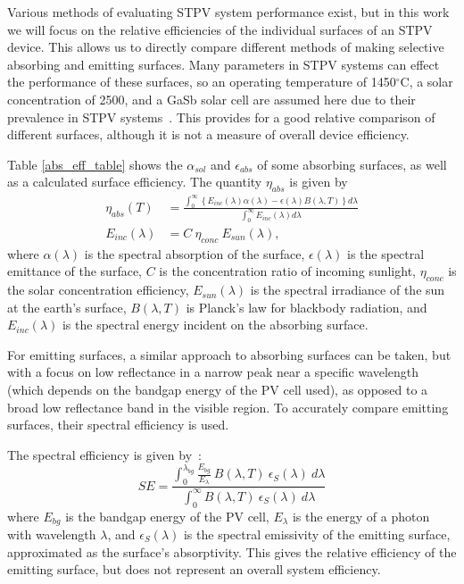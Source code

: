 \documentclass[10pt,letterpaper]{article}
\begin{document}
Various methods of evaluating STPV system performance exist, but in this work we will focus on the relative efficiencies of the individual surfaces of an STPV device.  This allows us to directly compare different methods of making selective absorbing and emitting surfaces.  Many parameters in STPV systems can effect the performance of these surfaces, so an operating temperature of 1450$^\circ$C, a solar concentration of 2500, and a GaSb solar cell are assumed here due to their prevalence in STPV systems~\cite{exp_tokyo,exp_madrid,exp_russia,me1,me2,RF_OptExp_2009}.  This provides for a good relative comparison of different surfaces, although it is not a measure of overall device efficiency.

Table \ref{abs_eff_table} shows the $\alpha_{sol}$ and $\epsilon_{abs}$ of some absorbing surfaces, as well as a calculated surface efficiency.  The quantity $\eta_{abs}$ is given by
\begin{align}
\label{overall_sss_eq}\eta_{abs}(T)& = \frac{\int_{0}^{\infty}\left\{E_{inc}(\lambda)\alpha(\lambda)-\epsilon(\lambda)B(\lambda,T)\right\}d\lambda}{\int_{0}^{\infty}E_{inc}(\lambda)d\lambda}\\
\label{e_incident}E_{inc}(\lambda) &= C \: \eta_{conc} \: E_{sun}(\lambda),
\end{align}
where $\alpha(\lambda)$ is the spectral absorption of the surface, $\epsilon(\lambda)$ is the spectral emittance of the surface, $C$ is the concentration ratio of incoming sunlight, 
$\eta_{conc}$ is the solar concentration efficiency, $E_{sun}(\lambda)$ is the 
spectral irradiance of the sun at the earth's surface, $B(\lambda, T)$ is 
Planck's law for blackbody radiation, and $E_{inc}(\lambda)$ is the spectral 
energy incident on the absorbing surface.

For emitting surfaces, a similar approach to absorbing surfaces can be taken, but with a focus on low reflectance in a narrow peak near a specific wavelength (which depends on the bandgap energy of the PV cell used), as opposed to a broad low reflectance band in the visible region.  To accurately compare emitting surfaces, their spectral efficiency is used.

The spectral efficiency is given by~\cite{me2}:
\begin{equation}\label{SpecEff}
SE = \frac{  \int_0^{\lambda_{bg}} \frac{ E_{bg} }{E_{\lambda}} \: B(\lambda, T) \: \epsilon_S (\lambda) \: d\lambda }
{\int_0^{\infty} B(\lambda,T) \: \epsilon_S (\lambda) \: d\lambda}
\end{equation}
where $E_{bg}$ is the bandgap energy of the PV cell, $E_{\lambda}$ is the energy of a photon with wavelength $\lambda$, and $\epsilon_S (\lambda)$ is the spectral emissivity of the emitting surface, approximated as the surface's absorptivity.  This gives the relative efficiency of the emitting surface, but does not represent an overall system efficiency.
\end{document}
